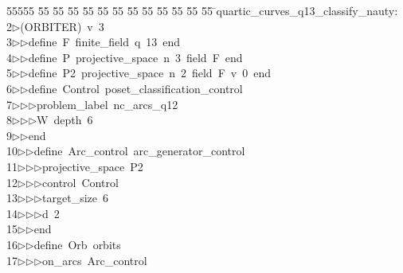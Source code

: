 %
%
\begin{tabbing}
55555 \= 55 \= 55 \= 55 \= 55 \= 55 \= 55 \= 55 \= 55 \= 55 \= 55 \= 55 \= 55 \= \>quartic\_curves\_q13\_classify\_nauty:\\[0pt]
2\>$\triangleright$\>(ORBITER)\ v\ 3\ \\[0pt]
3\>$\triangleright$\>$\triangleright$\>define\ F\ finite\_field\ q\ 13\ end\ \\[0pt]
4\>$\triangleright$\>$\triangleright$\>define\ P\ projective\_space\ n\ 3\ field\ F\ end\ \\[0pt]
5\>$\triangleright$\>$\triangleright$\>define\ P2\ projective\_space\ n\ 2\ field\ F\ v\ 0\ end\ \\[0pt]
6\>$\triangleright$\>$\triangleright$\>define\ Control\ poset\_classification\_control\ \\[0pt]
7\>$\triangleright$\>$\triangleright$\>$\triangleright$\>problem\_label\ nc\_arcs\_q12\ \\[0pt]
8\>$\triangleright$\>$\triangleright$\>$\triangleright$\>W\ depth\ 6\ \\[0pt]
9\>$\triangleright$\>$\triangleright$\>end\ \\[0pt]
10\>$\triangleright$\>$\triangleright$\>define\ Arc\_control\ arc\_generator\_control\ \\[0pt]
11\>$\triangleright$\>$\triangleright$\>$\triangleright$\>projective\_space\ P2\ \\[0pt]
12\>$\triangleright$\>$\triangleright$\>$\triangleright$\>control\ Control\ \\[0pt]
13\>$\triangleright$\>$\triangleright$\>$\triangleright$\>target\_size\ 6\ \\[0pt]
14\>$\triangleright$\>$\triangleright$\>$\triangleright$\>d\ 2\ \\[0pt]
15\>$\triangleright$\>$\triangleright$\>end\ \\[0pt]
16\>$\triangleright$\>$\triangleright$\>define\ Orb\ orbits\ \\[0pt]
17\>$\triangleright$\>$\triangleright$\>$\triangleright$\>on\_arcs\ Arc\_control\ \\[0pt]

\end{tabbing}
